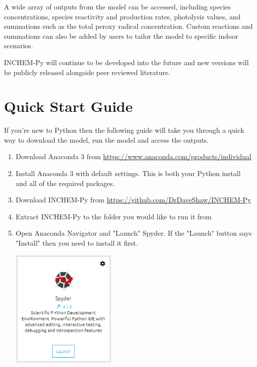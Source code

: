 \documentclass[a4paper]{refart}
\begin{document}
A wide array of outputs from the model can be accessed, including species concentrations, species reactivity and production rates, photolysis values, and summations such as the total peroxy radical concentration. Custom reactions and summations can also be added by users to tailor the model to specific indoor scenarios.

INCHEM-Py will continue to be developed into the future and new versions will be publicly released alongside peer reviewed literature. 

\section{Quick Start Guide}\label{Quick start}
\vspace{0.2cm}
{\hspace*{-\leftmarginwidth}
\begin{minipage}{\fullwidth}
If you're new to Python then the following guide will take you through a quick way to download the model, run the model and access the outputs.
\linespread{2.0}\selectfont
\begin{enumerate}
    \item Download Anaconda 3 from \url{https://www.anaconda.com/products/individual}
    \item Install Anaconda 3 with default settings. This is both your Python install and all of the required packages.
    \item Download INCHEM-Py from \url{https://github.com/DrDaveShaw/INCHEM-Py}
    \item Extract INCHEM-Py to the folder you would like to run it from
    \item Open Anaconda Navigator and "Launch" Spyder. If the "Launch" button says "Install" then you need to install it first.
            
            \vspace{1em}
            \begin{minipage}[t]{\linewidth}
                \centering
                \includegraphics[width = 0.4\textwidth]{Spyder.png}
            \end{minipage}
            

\end{enumerate}
\end{minipage}}
\end{document}
